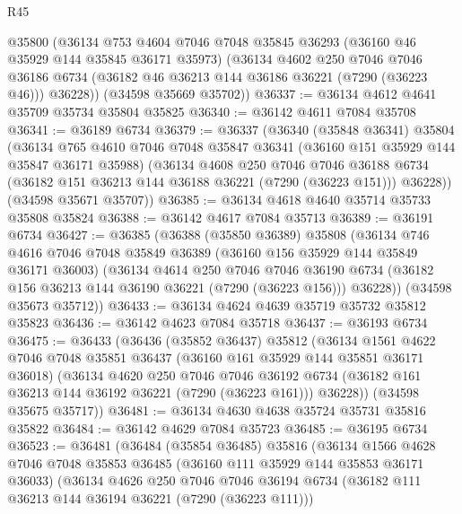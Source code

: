 \begin{lexlean}{R45}
\begin{coremodule}
{      @35800
      (@36134
        @753
        @4604
        @7046
        @7048
        @35845
        @36293
        (@36160 @46 @35929 @144 @35845 @36171 @35973)
        (@36134
          @4602
          @250
          @7046
          @7046
          @36186
          @6734
          (@36182 @46 @36213 @144 @36186 @36221 (@7290 (@36223 @46)))
          @36228))
      (@34598 @35669 @35702))
@36337 := @36134 @4612 @4641 @35709 @35734 @35804 @35825
@36340 := @36142 @4611 @7084 @35708
@36341 := @36189 @6734
@36379 := @36337
    (@36340
      (@35848 @36341)
      @35804
      (@36134
        @765
        @4610
        @7046
        @7048
        @35847
        @36341
        (@36160 @151 @35929 @144 @35847 @36171 @35988)
        (@36134
          @4608
          @250
          @7046
          @7046
          @36188
          @6734
          (@36182 @151 @36213 @144 @36188 @36221 (@7290 (@36223 @151)))
          @36228))
      (@34598 @35671 @35707))
@36385 := @36134 @4618 @4640 @35714 @35733 @35808 @35824
@36388 := @36142 @4617 @7084 @35713
@36389 := @36191 @6734
@36427 := @36385
    (@36388
      (@35850 @36389)
      @35808
      (@36134
        @746
        @4616
        @7046
        @7048
        @35849
        @36389
        (@36160 @156 @35929 @144 @35849 @36171 @36003)
        (@36134
          @4614
          @250
          @7046
          @7046
          @36190
          @6734
          (@36182 @156 @36213 @144 @36190 @36221 (@7290 (@36223 @156)))
          @36228))
      (@34598 @35673 @35712))
@36433 := @36134 @4624 @4639 @35719 @35732 @35812 @35823
@36436 := @36142 @4623 @7084 @35718
@36437 := @36193 @6734
@36475 := @36433
    (@36436
      (@35852 @36437)
      @35812
      (@36134
        @1561
        @4622
        @7046
        @7048
        @35851
        @36437
        (@36160 @161 @35929 @144 @35851 @36171 @36018)
        (@36134
          @4620
          @250
          @7046
          @7046
          @36192
          @6734
          (@36182 @161 @36213 @144 @36192 @36221 (@7290 (@36223 @161)))
          @36228))
      (@34598 @35675 @35717))
@36481 := @36134 @4630 @4638 @35724 @35731 @35816 @35822
@36484 := @36142 @4629 @7084 @35723
@36485 := @36195 @6734
@36523 := @36481
    (@36484
      (@35854 @36485)
      @35816
      (@36134
        @1566
        @4628
        @7046
        @7048
        @35853
        @36485
        (@36160 @111 @35929 @144 @35853 @36171 @36033)
        (@36134
          @4626
          @250
          @7046
          @7046
          @36194
          @6734
          (@36182 @111 @36213 @144 @36194 @36221 (@7290 (@36223 @111)))
}
\end{coremodule}
\end{lexlean}
